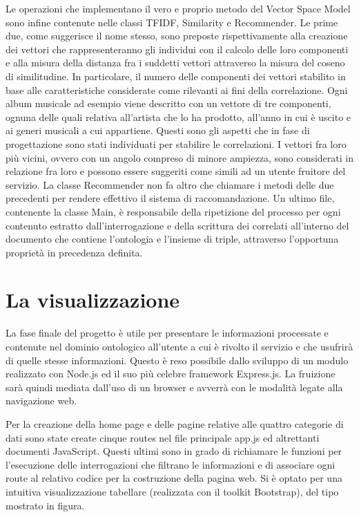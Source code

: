 \documentclass[Lau,binding=0.6cm,noexaminfo,oneside]{sapthesis}
\begin{document}
Le operazioni che implementano il vero e proprio metodo del Vector Space Model sono infine contenute nelle classi TFIDF, Similarity e Recommender. Le prime due, come suggerisce il nome stesso, sono preposte rispettivamente alla creazione dei vettori che rappresenteranno gli individui con il calcolo delle loro componenti e alla misura della distanza fra i suddetti vettori attraverso la misura del coseno di similitudine. In particolare, il numero delle componenti dei vettori  stabilito in base alle caratteristiche considerate come rilevanti ai fini della correlazione. Ogni album musicale ad esempio viene descritto con un vettore di tre componenti, ognuna delle quali relativa all'artista che lo ha prodotto, all'anno in cui è uscito e ai generi musicali a cui appartiene. Questi sono gli aspetti che in fase di progettazione sono stati individuati per stabilire le correlazioni. I vettori fra loro più vicini, ovvero con un angolo compreso di minore ampiezza, sono considerati in relazione fra loro e possono essere suggeriti come simili ad un utente fruitore del servizio. La classe Recommender non fa altro che chiamare i metodi delle due precedenti per rendere effettivo il sistema di raccomandazione. Un ultimo file, contenente la classe Main, è responsabile della ripetizione del processo per ogni contenuto estratto dall'interrogazione e della scrittura dei correlati all'interno del documento che contiene l'ontologia e l'insieme di triple, attraverso l'opportuna proprietà in precedenza definita.

\section{La visualizzazione}

La fase finale del progetto è utile per presentare le informazioni processate e contenute nel dominio ontologico all'utente a cui è rivolto il servizio e che usufrirà di quelle stesse informazioni. Questo è reso possibile dallo sviluppo di un modulo realizzato con Node.js ed il suo più celebre framework Express.js. La fruizione sarà quindi mediata dall'uso di un browser e avverrà con le modalità legate alla navigazione web.\medskip

Per la creazione della home page e delle pagine relative alle quattro categorie di dati sono state create cinque routes nel file principale app.js ed altrettanti documenti JavaScript. Questi ultimi sono in grado  di richiamare le funzioni per l'esecuzione delle interrogazioni che filtrano le informazioni e di associare ogni route al relativo codice per la costruzione della pagina web. Si è optato per una intuitiva visualizzazione tabellare (realizzata con il toolkit Bootstrap), del tipo mostrato in figura.\medskip
\end{document}
